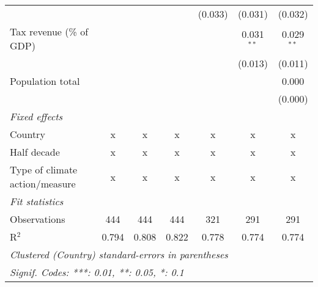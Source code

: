 \begin{tabular}{lcccccc}
                                                         &         &                &                & (0.033)        & (0.031)        & (0.032)\\   
   Tax revenue (\% of GDP)                               &         &                &                &                & 0.031$^{**}$   & 0.029$^{**}$\\   
                                                         &         &                &                &                & (0.013)        & (0.011)\\   
   Population total                                      &         &                &                &                &                & 0.000\\   
                                                         &         &                &                &                &                & (0.000)\\   
   \emph{Fixed effects}\\
   Country                                               & x       & x              & x              & x              & x              & x\\  
   Half decade                                           & x       & x              & x              & x              & x              & x\\  
   Type of climate action/measure                        & x       & x              & x              & x              & x              & x\\  
   \midrule \emph{Fit statistics}\\
   Observations                                          & 444     & 444            & 444            & 321            & 291            & 291\\  
   R$^2$                                                 & 0.794   & 0.808          & 0.822          & 0.778          & 0.774          & 0.774\\  
   \midrule
   \multicolumn{7}{l}{\emph{Clustered (Country) standard-errors in parentheses}}\\
   \multicolumn{7}{l}{\emph{Signif. Codes: ***: 0.01, **: 0.05, *: 0.1}}\\
\end{tabular}
\par\endgroup


